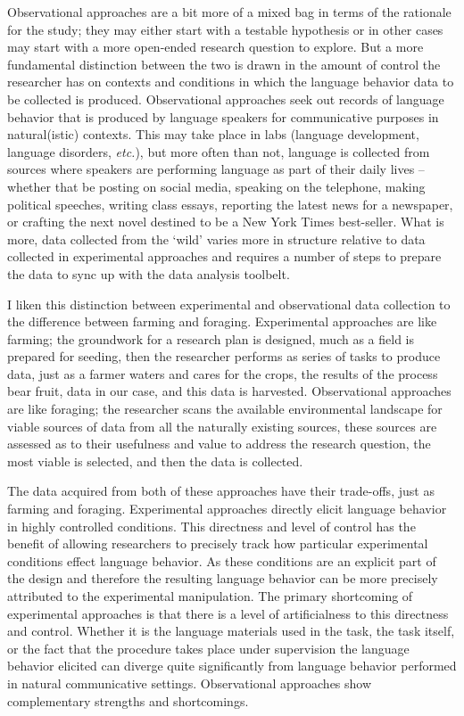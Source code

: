 \documentclass[
  letterpaper,
  DIV=11,
  numbers=noendperiod]{scrreport}
\theoremstyle{definition}
\theoremstyle{remark}
\begin{document}
Observational approaches are a bit more of a mixed bag in terms of the
rationale for the study; they may either start with a testable
hypothesis or in other cases may start with a more open-ended research
question to explore. But a more fundamental distinction between the two
is drawn in the amount of control the researcher has on contexts and
conditions in which the language behavior data to be collected is
produced. Observational approaches seek out records of language behavior
that is produced by language speakers for communicative purposes in
natural(istic) contexts. This may take place in labs (language
development, language disorders, \emph{etc.}), but more often than not,
language is collected from sources where speakers are performing
language as part of their daily lives --whether that be posting on
social media, speaking on the telephone, making political speeches,
writing class essays, reporting the latest news for a newspaper, or
crafting the next novel destined to be a New York Times best-seller.
What is more, data collected from the `wild' varies more in structure
relative to data collected in experimental approaches and requires a
number of steps to prepare the data to sync up with the data analysis
toolbelt.

I liken this distinction between experimental and observational data
collection to the difference between farming and foraging. Experimental
approaches are like farming; the groundwork for a research plan is
designed, much as a field is prepared for seeding, then the researcher
performs as series of tasks to produce data, just as a farmer waters and
cares for the crops, the results of the process bear fruit, data in our
case, and this data is harvested. Observational approaches are like
foraging; the researcher scans the available environmental landscape for
viable sources of data from all the naturally existing sources, these
sources are assessed as to their usefulness and value to address the
research question, the most viable is selected, and then the data is
collected.

The data acquired from both of these approaches have their trade-offs,
just as farming and foraging. Experimental approaches directly elicit
language behavior in highly controlled conditions. This directness and
level of control has the benefit of allowing researchers to precisely
track how particular experimental conditions effect language behavior.
As these conditions are an explicit part of the design and therefore the
resulting language behavior can be more precisely attributed to the
experimental manipulation. The primary shortcoming of experimental
approaches is that there is a level of artificialness to this directness
and control. Whether it is the language materials used in the task, the
task itself, or the fact that the procedure takes place under
supervision the language behavior elicited can diverge quite
significantly from language behavior performed in natural communicative
settings. Observational approaches show complementary strengths and
shortcomings.
\end{document}
